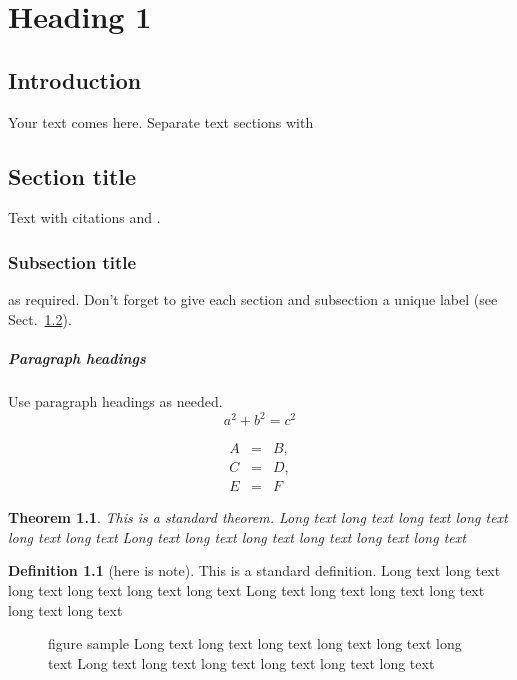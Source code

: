 \documentclass{akabook}
\newtheorem{theorem}{Theorem}
\theoremstyle{definition}
\newtheorem{definition}{Definition}
\begin{document}
\chapter{Heading 1}

\section{Introduction}
\label{intro}
Your text comes here. Separate text sections with
\section{Section title}
\label{sec:1}
Text with citations \cite{RefB} and \cite{RefJ}.
\subsection{Subsection title}
\label{sec:2}
as required. Don't forget to give each section
and subsection a unique label (see Sect.~\ref{sec:1}).
\paragraph{Paragraph headings} Use paragraph headings as needed.
\begin{equation}
a^2+b^2=c^2
\end{equation}

\begin{eqnarray}
A&=&B,\\
C&=&D,\\
E&=&F
\end{eqnarray}

\begin{theorem}
This is a standard theorem.
Long text long text long text long text long text long text
Long text long text long text long text long text long text
\end{theorem}

\begin{definition}[here is note]
This is a standard definition.
Long text long text long text long text long text long text
Long text long text long text long text long text long text
\end{definition}

\begin{figure}
\caption{figure sample 
Long text long text long text long text long text long text
Long text long text long text long text long text long text}
\end{figure}
\end{document}
